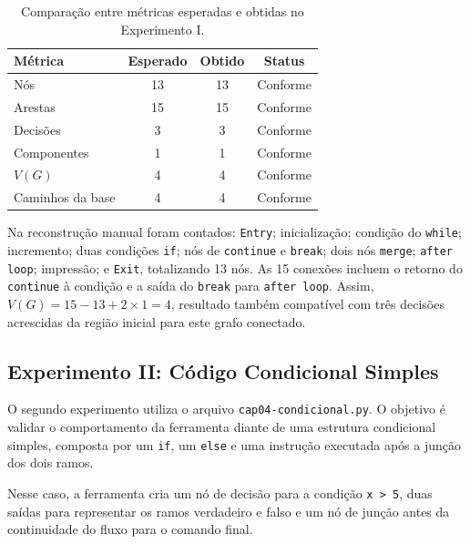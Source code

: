 \begin{table}[H]
    \centering
    \caption{Comparação entre métricas esperadas e obtidas no Experimento I.}
    \begin{tabular}{l | c | c | c}
        \hline
        \textbf{Métrica} & \textbf{Esperado} & \textbf{Obtido} & \textbf{Status} \\ \hline
        Nós & 13 & 13 & Conforme \\ \hline
        Arestas & 15 & 15 & Conforme \\ \hline
        Decisões & 3 & 3 & Conforme \\ \hline
        Componentes & 1 & 1 & Conforme \\ \hline
        \(V(G)\) & 4 & 4 & Conforme \\ \hline
        Caminhos da base & 4 & 4 & Conforme \\ \hline
    \end{tabular}
    \label{tab:experimento1_guy}
\end{table}

Na reconstrução manual foram contados: \texttt{Entry}; inicialização; condição do \texttt{while}; incremento; duas condições \texttt{if}; nós de \texttt{continue} e \texttt{break}; dois nós \texttt{merge}; \texttt{after loop}; impressão; e \texttt{Exit}, totalizando 13 nós. As 15 conexões incluem o retorno do \texttt{continue} à condição e a saída do \texttt{break} para \texttt{after loop}. Assim, \(V(G) = 15 - 13 + 2 \times 1 = 4\), resultado também compatível com três decisões acrescidas da região inicial para este grafo conectado.

\subsection{Experimento II: Código Condicional Simples}

O segundo experimento utiliza o arquivo \texttt{cap04-condicional.py}. O objetivo é validar o comportamento da ferramenta diante de uma estrutura condicional simples, composta por um \texttt{if}, um \texttt{else} e uma instrução executada após a junção dos dois ramos.


\label{lst:experimento2_codigo}

Nesse caso, a ferramenta cria um nó de decisão para a condição \texttt{x > 5}, duas saídas para representar os ramos verdadeiro e falso e um nó de junção antes da continuidade do fluxo para o comando final.

